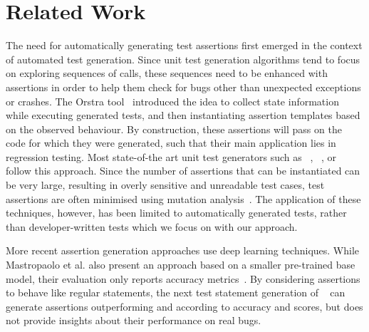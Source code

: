 
\section{Related Work}


The need for automatically generating test assertions first emerged in
the context of automated test generation. Since unit test generation
algorithms tend to focus on exploring sequences of calls, these
sequences need to be enhanced with assertions in order to help them
check for bugs other than unexpected exceptions or crashes. The Orstra
tool~\cite{Xie2006} introduced the idea to collect state information
while executing generated tests, and then instantiating assertion
templates based on the observed behaviour. By construction, these
assertions will pass on the code for which they were generated, such
that their main application lies in regression testing. Most
state-of-the art unit test generators such as
\evosuite~\cite{Fraser2011a}, ~\cite{Pacheco2007},
or ~\cite{9793730} follow this approach. Since the
number of assertions that can be instantiated can be very large,
resulting in overly sensitive and unreadable test cases, test
assertions are often minimised using mutation analysis~\cite{6019060}.
The application of these techniques, however, has been limited to
automatically generated tests, rather than developer-written tests
which we focus on with our approach.

More recent assertion generation approaches use deep learning
techniques. While {Mastropaolo et al.} also present an approach based
on a smaller pre-trained \tfive base model, their evaluation only
reports  accuracy metrics~\cite{Mastropaolo2021}.
By considering assertions to behave like regular statements, the next
test statement generation of ~\cite{Nie2023} can
generate assertions outperforming \atlas and \toga according to
accuracy and \bleu scores, but does not provide insights about their
performance on real bugs.


